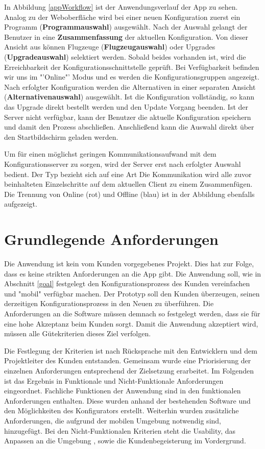In Abbildung \ref{appWorkflow} ist der Anwendungsverlauf der App zu sehen. Analog zu der Weboberfläche wird bei einer neuen Konfiguration zuerst ein Programm (\textbf{Programmauswahl}) ausgewählt. Nach der Auswahl gelangt der Benutzer in eine \textbf{Zusammenfassung} der aktuellen Konfiguration. Von dieser Ansicht aus können Flugzeuge (\textbf{Flugzeugauswahl}) oder  Upgrades (\textbf{Upgradeauswahl}) selektiert werden. Sobald beides vorhanden ist, wird die Erreichbarkeit der Konfigurationsschnittstelle geprüft. Bei Verfügbarkeit befinden wir uns im "'Online"' Modus und es werden die Konfigurationsgruppen angezeigt. Nach erfolgter Konfiguration werden die Alternativen in einer separaten Ansicht (\textbf{Alternativenauswahl}) ausgewählt. Ist die Konfiguration vollständig, so kann das Upgrade direkt bestellt werden und den Update Vorgang beenden. Ist der Server nicht verfügbar, kann der Benutzer die aktuelle Konfiguration speichern und damit den Prozess abschließen. Anschließend kann die Auswahl direkt über den Startbildschirm geladen werden. \par

Um für einen möglichst geringen Kommunikationsaufwand mit dem Konfigurationsserver zu sorgen, wird der Server erst nach erfolgter Auswahl bedient. Der Typ bezieht sich auf eine Art Die Kommunikation wird alle zuvor beinhalteten Einzelschritte auf dem aktuellen Client zu einem Zusammenfügen. Die Trennung von Online (rot) und Offline (blau)  ist in der Abbildung ebenfalls aufgezeigt. 

\section{Grundlegende Anforderungen} \label{requirements}
Die Anwendung ist kein vom Kunden vorgegebenes Projekt. Dies hat zur Folge, dass es keine strikten Anforderungen an die App gibt. Die Anwendung soll, wie in Abschnitt \ref{goal} festgelegt den Konfigurationsprozess des Kunden vereinfachen und "mobil" verfügbar machen. Der Prototyp soll den Kunden überzeugen, seinen derzeitigen Konfigurationsprozess in den Neuen zu überführen. Die Anforderungen an die Software müssen demnach so festgelegt werden, dass sie für eine hohe Akzeptanz beim Kunden sorgt. Damit die Anwendung akzeptiert wird, müssen alle Gütekriterien dieses Ziel verfolgen. \par

Die Festlegung der Kriterien ist nach Rücksprache mit den Entwicklern und dem Projektleiter des Kunden entstanden. Gemeinsam wurde eine Priorisierung der einzelnen Anforderungen entsprechend der Zielsetzung erarbeitet. Im Folgenden ist das Ergebnis in Funktionale und Nicht-Funktionale Anforderungen eingeordnet. Fachliche Funktionen der Anwendung sind in den funktionalen Anforderungen enthalten. Diese wurden anhand der bestehenden Software und den Möglichkeiten des Konfigurators erstellt. Weiterhin wurden zusätzliche Anforderungen, die aufgrund der mobilen Umgebung notwendig sind, hinzugefügt. Bei den Nicht-Funktionalen Kriterien steht die Usability, das Anpassen an die Umgebung , sowie die Kundenbegeisterung im Vordergrund. 


